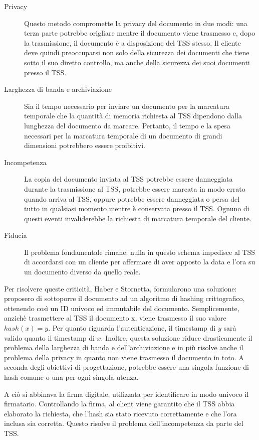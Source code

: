 \begin{description}
  \item[Privacy] Questo metodo compromette la privacy del documento in due modi: una terza parte potrebbe origliare mentre il documento viene trasmesso e, dopo la trasmissione, il documento è a disposizione del TSS stesso. Il cliente deve quindi preoccuparsi non solo della sicurezza dei documenti che tiene sotto il suo diretto controllo, ma anche della sicurezza dei suoi documenti presso il TSS.
  \item[Larghezza di banda e archiviazione] Sia il tempo necessario per inviare un documento per la marcatura temporale che la quantità di memoria richiesta al TSS dipendono dalla lunghezza del documento da marcare. Pertanto, il tempo e la spesa necessari per la marcatura temporale di un documento di grandi dimensioni potrebbero essere proibitivi. 
  \item[Incompetenza] La copia del documento inviata al TSS potrebbe essere danneggiata durante la trasmissione al TSS, potrebbe essere marcata in modo errato quando arriva al TSS, oppure potrebbe essere danneggiata o persa del tutto in qualsiasi momento mentre è conservata presso il TSS. Ognuno di questi eventi invaliderebbe la richiesta di marcatura temporale del cliente.
  \item[Fiducia] Il problema fondamentale rimane: nulla in questo schema impedisce al TSS di accordarsi con un cliente per affermare di aver apposto la data e l'ora su un documento diverso da quello reale.
\end{description}

Per risolvere queste criticità, Haber e Stornetta, formularono una soluzione: proposero di sottoporre il documento ad un algoritmo di hashing crittografico, ottenendo così un ID univoco ed immutabile del documento.
Semplicemente, anzichè trasmettere al TSS il documento x, viene trasmesso il suo valore \(hash(x) = y\). Per quanto riguarda l'autenticazione, il timestamp di \(y\) sarà valido quanto il timestamp di \(x\). Inoltre, questa soluzione riduce drasticamente il problema della larghezza di banda e dell'archiviazione e in più risolve anche il problema della privacy in quanto non viene trasmesso il documento in toto. A seconda degli obiettivi di progettazione, potrebbe essere una singola funzione di hash comune o una per ogni singola utenza.

A ciò si abbinava la firma digitale, utilizzata per identificare in modo univoco il firmatario. Controllando la firma, al client viene garantito che il TSS abbia elaborato la richiesta, che l'hash sia stato ricevuto correttamente e che l'ora inclusa sia corretta. Questo risolve il problema dell'incompetenza da parte del TSS.


